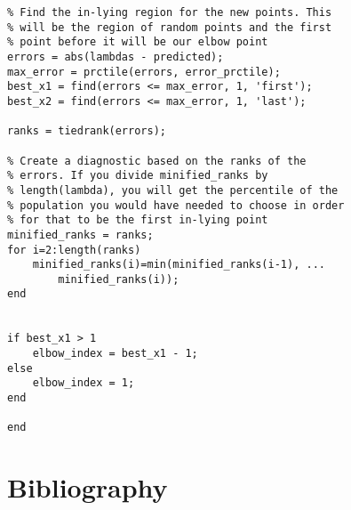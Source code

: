 \documentclass[10pt,letterpaper]{book}
\begin{document}
\begin{lstlisting}
% Find the in-lying region for the new points. This
% will be the region of random points and the first
% point before it will be our elbow point
errors = abs(lambdas - predicted);
max_error = prctile(errors, error_prctile);
best_x1 = find(errors <= max_error, 1, 'first');
best_x2 = find(errors <= max_error, 1, 'last');

ranks = tiedrank(errors);

% Create a diagnostic based on the ranks of the
% errors. If you divide minified_ranks by 
% length(lambda), you will get the percentile of the
% population you would have needed to choose in order
% for that to be the first in-lying point
minified_ranks = ranks;
for i=2:length(ranks)
    minified_ranks(i)=min(minified_ranks(i-1), ...
        minified_ranks(i)); 
end


if best_x1 > 1
    elbow_index = best_x1 - 1;
else
    elbow_index = 1;
end

end
\end{lstlisting}



\chapter{Bibliography}


\end{document}
